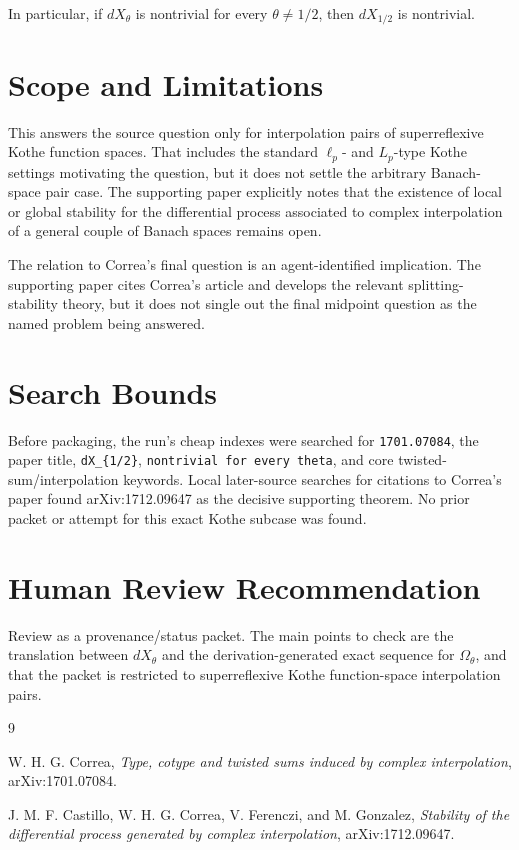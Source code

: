 \documentclass[11pt]{article}
\begin{document}
\medskip
\noindent
In particular, if \(dX_\theta\) is nontrivial for every
\(\theta\ne 1/2\), then \(dX_{1/2}\) is nontrivial.

\section*{Scope and Limitations}

This answers the source question only for interpolation pairs of
superreflexive Kothe function spaces. That includes the standard
\(\ell_p\)- and \(L_p\)-type Kothe settings motivating the question, but it
does not settle the arbitrary Banach-space pair case. The supporting paper
explicitly notes that the existence of local or global stability for the
differential process associated to complex interpolation of a general couple
of Banach spaces remains open.

The relation to Correa's final question is an agent-identified implication.
The supporting paper cites Correa's article and develops the relevant
splitting-stability theory, but it does not single out the final midpoint
question as the named problem being answered.

\section*{Search Bounds}

Before packaging, the run's cheap indexes were searched for
\texttt{1701.07084}, the paper title, \texttt{dX\_\{1/2\}},
\texttt{nontrivial for every theta}, and core twisted-sum/interpolation
keywords. Local later-source searches for citations to Correa's paper found
arXiv:1712.09647 as the decisive supporting theorem. No prior packet or
attempt for this exact Kothe subcase was found.

\section*{Human Review Recommendation}

Review as a provenance/status packet. The main points to check are the
translation between \(dX_\theta\) and the derivation-generated exact sequence
for \(\Omega_\theta\), and that the packet is restricted to superreflexive
Kothe function-space interpolation pairs.

\begin{thebibliography}{9}

W. H. G. Correa,
\emph{Type, cotype and twisted sums induced by complex interpolation},
arXiv:1701.07084.

J. M. F. Castillo, W. H. G. Correa, V. Ferenczi, and M. Gonzalez,
\emph{Stability of the differential process generated by complex interpolation},
arXiv:1712.09647.

\end{thebibliography}
\end{document}
